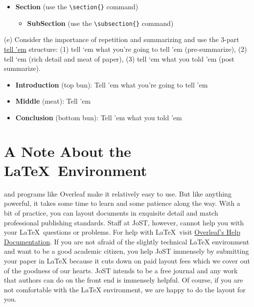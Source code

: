 \documentclass{tufte-handout}
\begin{document}
\begin{itemize}
   \item  \textbf{Section} (use the \verb|\section{}| command)
   \begin{itemize}
     \item  \textbf{SubSection} (use the \verb|\subsection{}| command)
   \end{itemize}
 \end{itemize}


(e) Consider the importance of repetition and summarizing and use the 3-part \href{Write your first and then write it last.   Your abstractshould grab your reader and also tell them what the paper is about.Write it first to structure your thinking and then rewrite it whenyou are finished with your paper to make sure it is tight and clean.Include only what is absolutely necessary. Tell the reader what youset out to do, what you did, and the results and conclusions. Keepit brief. Don’t exceed 300 words.}{tell 'em} structure: (1) tell ‘em what you're going to tell 'em (pre-summarize), (2) tell ‘em (rich detail and meat of paper), (3) tell ‘em what you told 'em (post summarize). 

\begin{itemize}
\item  \textbf{Introduction} (top bun): Tell 'em what you're going to tell 'em
\item  \textbf{Middle} (meat): Tell 'em
\item  \textbf{Conclusion} (bottom bun): Tell 'em what you told 'em
\end{itemize}

\section{A Note About the \LaTeX\ Environment}\label{sec:latex-note} 
 and programs like Overleaf make it relatively easy to use. But like anything powerful, it takes some time to learn and some patience along the way. With a bit of practice, you can layout documents in exquisite detail and match professional publishing standards. Staff at JoST, however, cannot help you with your \LaTeX\ questions or problems. For help with \LaTeX\ visit \href{https://www.overleaf.com/learn}{Overleaf's Help Documentation}. If you are not afraid of the slightly technical LaTeX environment and want to be a good academic citizen, you help JoST immensely by submitting your paper in LaTeX because it cuts down on paid layout fees which we cover out of the goodness of our hearts. JoST intends to be a free journal and any work that authors can do on the front end is immensely helpful. Of course, if you are not comfortable with the LaTeX environment, we are happy to do the layout for you.
\end{document}
